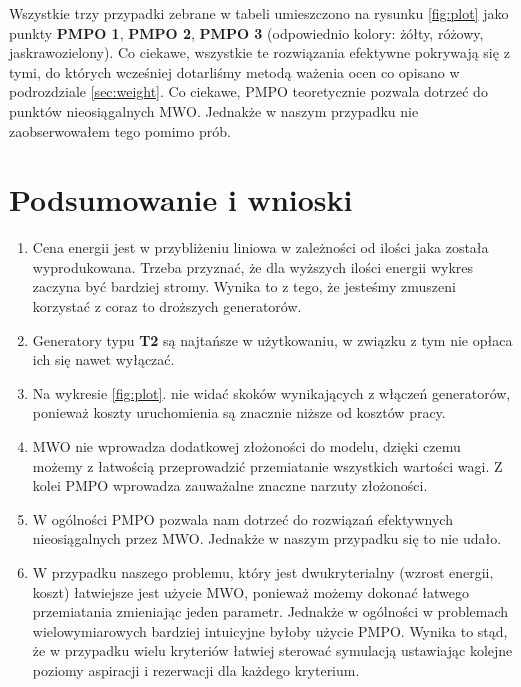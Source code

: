 \documentclass[12pt, twoside, hidelinks, a4paper]{article}
\begin{document}
Wszystkie trzy przypadki zebrane w tabeli umieszczono na rysunku \ref{fig:plot} jako punkty \textbf{PMPO 1}, \textbf{PMPO 2}, \textbf{PMPO 3} (odpowiednio kolory: żółty, różowy, jaskrawozielony). Co ciekawe, wszystkie te rozwiązania efektywne pokrywają się z tymi, do których wcześniej dotarliśmy metodą ważenia ocen co opisano w podrozdziale \ref{sec:weight}. Co ciekawe, PMPO teoretycznie pozwala dotrzeć do punktów nieosiągalnych MWO. Jednakże w naszym przypadku nie zaobserwowałem tego pomimo prób.

\section{Podsumowanie i wnioski}
\begin{enumerate}
\item Cena energii jest w przybliżeniu liniowa w zależności od ilości jaka została wyprodukowana. Trzeba przyznać, że dla wyższych ilości energii wykres zaczyna być bardziej stromy. Wynika to z tego, że jesteśmy zmuszeni korzystać z coraz to droższych generatorów.
\item Generatory typu \textbf{T2} są najtańsze w użytkowaniu, w związku z tym nie opłaca ich się nawet wyłączać.
\item Na wykresie \ref{fig:plot}. nie widać skoków wynikających z włączeń generatorów, ponieważ koszty uruchomienia są znacznie niższe od kosztów pracy.
\item MWO nie wprowadza dodatkowej złożoności do modelu, dzięki czemu możemy z łatwością przeprowadzić przemiatanie wszystkich wartości wagi. Z kolei PMPO wprowadza zauważalne znaczne narzuty złożoności.
\item W ogólności PMPO pozwala nam dotrzeć do rozwiązań efektywnych nieosiągalnych przez MWO. Jednakże w naszym przypadku się to nie udało.
\item W przypadku naszego problemu, który jest dwukryterialny (wzrost energii, koszt) łatwiejsze jest użycie MWO, ponieważ możemy dokonać łatwego przemiatania zmieniając jeden parametr. Jednakże w ogólności w problemach wielowymiarowych bardziej intuicyjne byłoby użycie PMPO. Wynika to stąd, że w przypadku wielu kryteriów łatwiej sterować symulacją ustawiając kolejne poziomy aspiracji i rezerwacji dla każdego kryterium.

\end{enumerate}
\end{document}
